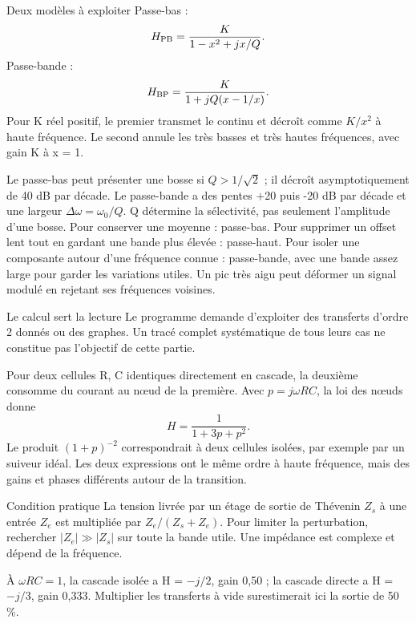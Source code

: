 \begin{loi}{Deux modèles à exploiter}
Passe-bas :\[H_{\rm PB}=\frac{K}{1-x^2+jx/Q}.\]Passe-bande :\[H_{\rm BP}=\frac{K}{1+jQ(x-1/x)}.\]Pour K réel positif, le premier transmet le continu et décroît comme $K/x^2$ à haute fréquence. Le second annule les très basses et très hautes fréquences, avec gain K à x = 1.
\end{loi}
Le passe-bas peut présenter une bosse si $Q>1/\sqrt2$ ; il décroît asymptotiquement de 40 dB par décade. Le passe-bande a des pentes +20 puis -20 dB par décade et une largeur $\Delta\omega=\omega_0/Q$. Q détermine la sélectivité, pas seulement l’amplitude d’une bosse.
Pour conserver une moyenne : passe-bas. Pour supprimer un offset lent tout en gardant une bande plus élevée : passe-haut. Pour isoler une composante autour d’une fréquence connue : passe-bande, avec une bande assez large pour garder les variations utiles. Un pic très aigu peut déformer un signal modulé en rejetant ses fréquences voisines.
\begin{docu}{Le calcul sert la lecture}
Le programme demande d’exploiter des transferts d’ordre 2 donnés ou des graphes. Un tracé complet systématique de tous leurs cas ne constitue pas l’objectif de cette partie.
\end{docu}


Pour deux cellules R, C identiques directement en cascade, la deuxième consomme du courant au nœud de la première. Avec $p=j\omega RC$, la loi des nœuds donne\[H=\frac1{1+3p+p^2}.\]Le produit $(1+p)^{-2}$ correspondrait à deux cellules isolées, par exemple par un suiveur idéal. Les deux expressions ont le même ordre à haute fréquence, mais des gains et phases différents autour de la transition.
\begin{methode}{Condition pratique}
La tension livrée par un étage de sortie de Thévenin $Z_s$ à une entrée $Z_e$ est multipliée par $Z_e/(Z_s+Z_e)$. Pour limiter la perturbation, rechercher $|Z_e|\gg|Z_s|$ sur toute la bande utile. Une impédance est complexe et dépend de la fréquence.
\end{methode}
À $\omega RC=1$, la cascade isolée a H = $-j/2$, gain 0,50 ; la cascade directe a H = $-j/3$, gain 0,333. Multiplier les transferts à vide surestimerait ici la sortie de 50 \%.


